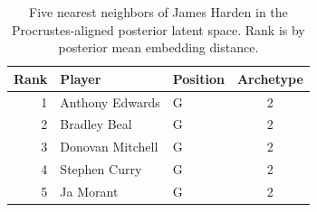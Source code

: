 \begin{table}[htbp]
  \centering\small
  \begin{tabular}{rllc}
    \toprule
    Rank & Player & Position & Archetype \\
    \midrule
    1 & Anthony Edwards & G & 2 \\
    2 & Bradley Beal & G & 2 \\
    3 & Donovan Mitchell & G & 2 \\
    4 & Stephen Curry & G & 2 \\
    5 & Ja Morant & G & 2 \\
    \bottomrule
  \end{tabular}
  \caption{Five nearest neighbors of James Harden in the Procrustes-aligned posterior latent space. Rank is by posterior mean embedding distance.}
  \label{tab:James_Harden_neighbors}
\end{table}


